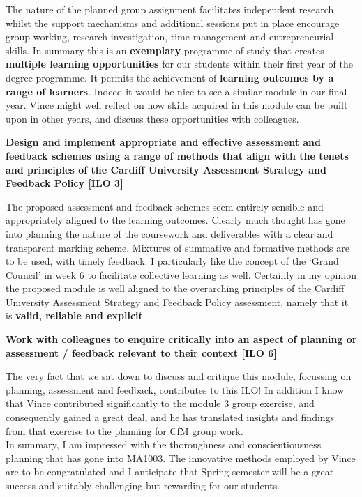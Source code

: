 \documentclass[a4paper,12pt]{article}
\begin{document}
The nature of the planned group assignment facilitates independent research whilst the support mechanisms and additional sessions put in place encourage group working, research investigation, time-management and entrepreneurial skills.  In summary this is an \textbf{exemplary} programme of study that creates \textbf{multiple learning opportunities} for our students within their first year of the degree programme.  It permits the achievement of \textbf{learning outcomes by a range of learners}.  Indeed it would be nice to see a similar module in our final year.  Vince might well reflect on how skills acquired in this module can be built upon in other years, and discuss these opportunities with colleagues.

\textbf {Design and implement appropriate and effective assessment and feedback schemes using a range of methods that align with the tenets and principles of the Cardiff University Assessment Strategy and Feedback Policy [ILO 3]}

The proposed assessment and feedback schemes seem entirely sensible and appropriately aligned to the learning outcomes.  Clearly much thought has gone into planning the nature of the coursework and deliverables with a clear and transparent marking scheme.  Mixtures of summative and formative methods are to be used, with timely feedback.  I particularly like the concept of the ‘Grand Council’ in week 6 to facilitate collective learning as well.  Certainly in my opinion the proposed module is well aligned to the overarching principles of the Cardiff University Assessment Strategy and Feedback Policy assessment, namely that it is \textbf{valid, reliable and explicit}.

\textbf {Work with colleagues to enquire critically into an aspect of planning or assessment / feedback relevant to their context [ILO 6]}

The very fact that we sat down to discuss and critique this module, focussing on planning, assessment and feedback, contributes to this ILO! In addition I know that Vince contributed significantly to the module 3 group exercise, and consequently gained a great deal, and he has translated insights and findings from that exercise to the planning for CfM group work.\\

In summary, I am impressed with the thoroughness and conscientiousness planning that has gone into MA1003. The innovative methods employed by Vince are to be congratulated and I anticipate that Spring semester will be a great success and suitably challenging but rewarding for our students.
\end{document}
